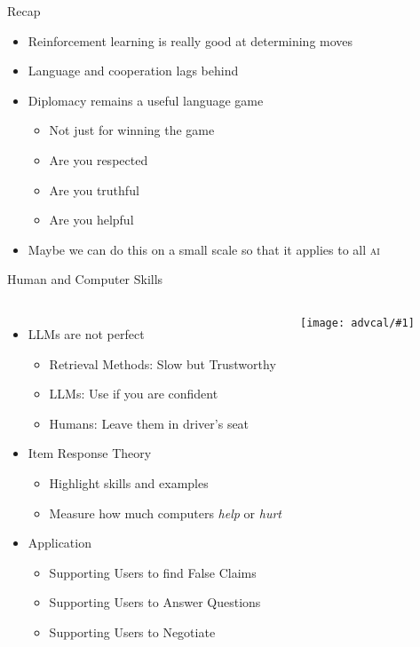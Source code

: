 \documentclass[compress]{beamer}
\newcommand{\abr}[1]{\textsc{#1} }
\newcommand{\gfxa}[2]{
	\begin{center}
		\texttt{[image: advcal/\#1]}
	\end{center}
}
\begin{document}
\begin{frame}{Recap}
	\begin{itemize}
		\item Reinforcement learning is really good at determining moves
		\item Language and cooperation lags behind
		\item Diplomacy remains a useful language game
		\begin{itemize}
			\item Not just for winning the game
			\item Are you respected
			\item Are you truthful
			\item Are you helpful
		\end{itemize}
		\item Maybe we can do this on a small scale so that it applies to all \abr{ai}
	\end{itemize}
	
\end{frame}


\begin{frame}{Human and Computer Skills}
	\begin{columns}
		
		\begin{itemize}
			\item LLMs are not perfect
			\begin{itemize}
				\item Retrieval Methods: Slow but Trustworthy
				\item LLMs: Use if you are confident
				\item Humans: Leave them in driver's seat
			\end{itemize}
			\item Item Response Theory
			\begin{itemize}
				\item Highlight skills and examples
				\item Measure how much computers \emph{help} or \emph{hurt}
			\end{itemize}
			\item Application
			\begin{itemize}
				\item Supporting Users to find False Claims
				\item Supporting Users to Answer Questions
				\item Supporting Users to Negotiate
			\end{itemize}
		\end{itemize}
		
		\gfxa{ken_vs_hal}{1}
	\end{columns}
\end{frame}
\end{document}
